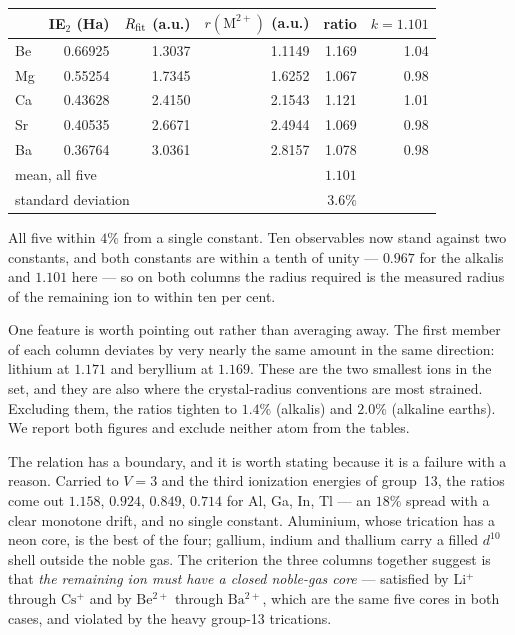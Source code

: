 \documentclass[11pt]{article}
\begin{document}
\begin{center}
\begin{tabular}{lrrrrr}
\toprule
 & IE$_2$ (Ha) & $R_{\rm fit}$ (a.u.) & $r(\mathrm{M^{2+}})$ (a.u.) & ratio & $k=1.101$ \\
\midrule
Be & 0.66925 & 1.3037 & 1.1149 & 1.169 & 1.04 \\
Mg & 0.55254 & 1.7345 & 1.6252 & 1.067 & 0.98 \\
Ca & 0.43628 & 2.4150 & 2.1543 & 1.121 & 1.01 \\
Sr & 0.40535 & 2.6671 & 2.4944 & 1.069 & 0.98 \\
Ba & 0.36764 & 3.0361 & 2.8157 & 1.078 & 0.98 \\
\midrule
\multicolumn{4}{l}{mean, all five} & $1.101$ & \\
\multicolumn{4}{l}{standard deviation} & $3.6\%$ & \\
\bottomrule
\end{tabular}
\end{center}

All five within $4\%$ from a single constant. Ten observables now stand against two constants,
and both constants are within a tenth of unity --- $0.967$ for the alkalis and $1.101$ here ---
so on both columns the radius required is the measured radius of the remaining ion to within ten
per cent.

One feature is worth pointing out rather than averaging away. The first member of each column
deviates by very nearly the same amount in the same direction: lithium at $1.171$ and beryllium
at $1.169$. These are the two smallest ions in the set, and they are also where the
crystal-radius conventions are most strained. Excluding them, the ratios tighten to $1.4\%$
(alkalis) and $2.0\%$ (alkaline earths). We report both figures and exclude neither atom from the
tables.

The relation has a boundary, and it is worth stating because it is a failure with a reason.
Carried to $V=3$ and the third ionization energies of group~13, the ratios come out
$1.158$, $0.924$, $0.849$, $0.714$ for Al, Ga, In, Tl --- an $18\%$ spread with a clear monotone
drift, and no single constant. Aluminium, whose trication has a neon core, is the best of the four;
gallium, indium and thallium carry a filled $d^{10}$ shell outside the noble gas. The criterion
the three columns together suggest is that \emph{the remaining ion must have a closed noble-gas
core} --- satisfied by $\mathrm{Li^+}$ through $\mathrm{Cs^+}$ and by $\mathrm{Be^{2+}}$ through
$\mathrm{Ba^{2+}}$, which are the same five cores in both cases, and violated by the heavy
group-13 trications.
\end{document}
